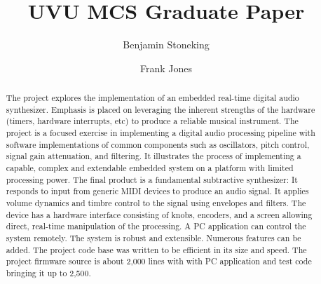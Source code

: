 \documentclass[acmlarge,screen]{acmart}
\begin{document}
\title{UVU MCS Graduate Paper}


\author{Benjamin Stoneking}

\author{Frank Jones}

\renewcommand{\shortauthors}{Candidate First Last}

\begin{abstract}
	The project explores the implementation of an embedded real-time digital audio synthesizer. Emphasis is placed on leveraging the inherent strengths of the hardware (timers, hardware interrupts, etc) to produce a reliable musical instrument. The project is a focused exercise in implementing a digital audio processing pipeline with software implementations of common components such as oscillators, pitch control, signal gain attenuation, and filtering. It illustrates the process of implementing a capable, complex and extendable embedded system on a platform with limited processing power. The final product is a fundamental subtractive synthesizer: It responds to input from generic MIDI devices to produce an audio signal. It applies volume dynamics and timbre control to the signal using envelopes and filters. The device has a hardware interface consisting of knobs, encoders, and a screen allowing direct, real-time manipulation of the processing. A PC application can control the system remotely. The system is robust and extensible. Numerous features can be added. The project code base was written to be efficient in its size and speed. The project firmware source is about 2,000 lines with with PC application and test code bringing it up to 2,500.
\end{abstract}
\end{document}
